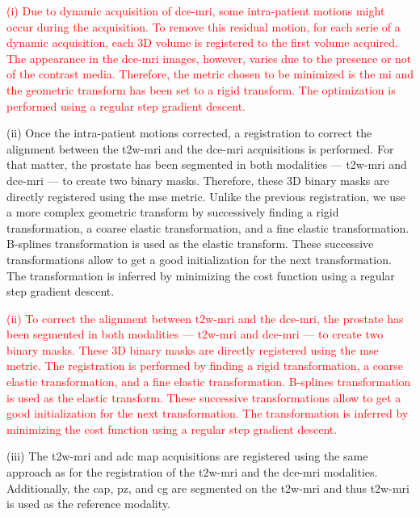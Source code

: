 \documentclass[a4paper,num-refs]{wiley-article}
\begin{document}
\textcolor{red}{(i) Due to dynamic acquisition of \ac{dce}-\ac{mri}, some
  intra-patient motions might occur during the acquisition. To remove
  this residual motion, for each serie of a dynamic acquisition, each 3D
  volume is registered to the first volume acquired. The appearance in the
  \ac{dce}-\ac{mri} images, however, varies due to the presence or not of the
  contrast media. Therefore, the metric chosen to be minimized is the \ac{mi}
  and the geometric transform has been set to a rigid transform. The
  optimization is performed using a regular step gradient descent.}

(ii) Once the intra-patient motions corrected, a registration to correct the
alignment between the \ac{t2w}-\ac{mri} and the \ac{dce}-\ac{mri} acquisitions
is performed. For that matter, the prostate has been segmented in both
modalities --- \ac{t2w}-\ac{mri} and \ac{dce}-\ac{mri} --- to create two binary
masks. Therefore, these 3D binary masks are directly registered using the
\ac{mse} metric. Unlike the previous registration, we use a more complex
geometric transform by successively finding a rigid transformation, a coarse
elastic transformation, and a fine elastic transformation. B-splines
transformation is used as the elastic transform. These successive
transformations allow to get a good initialization for the next transformation.
The transformation is inferred by minimizing the cost function using a regular
step gradient descent.

\textcolor{red}{(ii) To correct the alignment between \ac{t2w}-\ac{mri} and the
  \ac{dce}-\ac{mri}, the prostate has been segmented in both modalities ---
  \ac{t2w}-\ac{mri} and \ac{dce}-\ac{mri} --- to create two binary masks. These
  3D binary masks are directly registered using the \ac{mse} metric. The
  registration is performed by finding a rigid transformation, a coarse elastic
  transformation, and a fine elastic transformation. B-splines transformation
  is used as the elastic transform. These successive transformations allow to
  get a good initialization for the next transformation. The transformation is
  inferred by minimizing the cost function using a regular step gradient
  descent. }

(iii) The \ac{t2w}-\ac{mri} and \ac{adc} map acquisitions are registered using
the same approach as for the registration of the \ac{t2w}-\ac{mri} and the
\ac{dce}-\ac{mri} modalities.  Additionally, the \ac{cap}, \ac{pz}, and \ac{cg}
are segmented on the \ac{t2w}-\ac{mri} and thus \ac{t2w}-\ac{mri} is used as
the reference modality.
\end{document}
